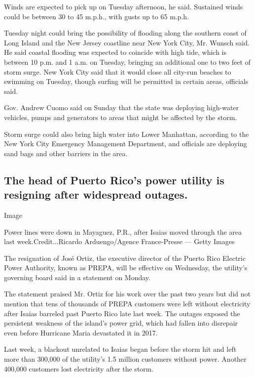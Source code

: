 Winds are expected to pick up on Tuesday afternoon, he said. Sustained
winds could be between 30 to 45 m.p.h., with gusts up to 65 m.p.h.

Tuesday night could bring the possibility of flooding along the southern
coast of Long Island and the New Jersey coastline near New York City,
Mr. Wunsch said. He said coastal flooding was expected to coincide with
high tide, which is between 10 p.m. and 1 a.m. on Tuesday, bringing an
additional one to two feet of storm surge. New York City said that it
would close all city-run beaches to swimming on Tuesday, though surfing
will be permitted in certain areas, officials said.

Gov. Andrew Cuomo said on Sunday that the state was deploying high-water
vehicles, pumps and generators to areas that might be affected by the
storm.

Storm surge could also bring high water into Lower Manhattan, according
to the New York City Emergency Management Department, and officials are
deploying sand bags and other barriers in the area.

\hypertarget{the-head-of-puerto-ricos-power-utility-is-resigning-after-widespread-outages}{%
\subsection{The head of Puerto Rico's power utility is resigning after
widespread
outages.}\label{the-head-of-puerto-ricos-power-utility-is-resigning-after-widespread-outages}}

Image

Power lines were down in Mayaguez, P.R., after Isaias moved through the
area last week.Credit...Ricardo Arduengo/Agence France-Presse --- Getty
Images

The resignation of José Ortiz, the executive director of the Puerto Rico
Electric Power Authority, known as PREPA, will be effective on
Wednesday, the utility's governing board said in a statement on Monday.

The statement praised Mr. Ortiz for his work over the past two years but
did not mention that tens of thousands of PREPA customers were left
without electricity after Isaias barreled past Puerto Rico late last
week. The outages exposed the persistent weakness of the island's power
grid, which had fallen into disrepair even before Hurricane Maria
devastated it in 2017.

Last week, a blackout unrelated to Isaias began before the storm hit and
left more than 300,000 of the utility's 1.5 million customers without
power. Another 400,000 customers lost electricity after the storm.

